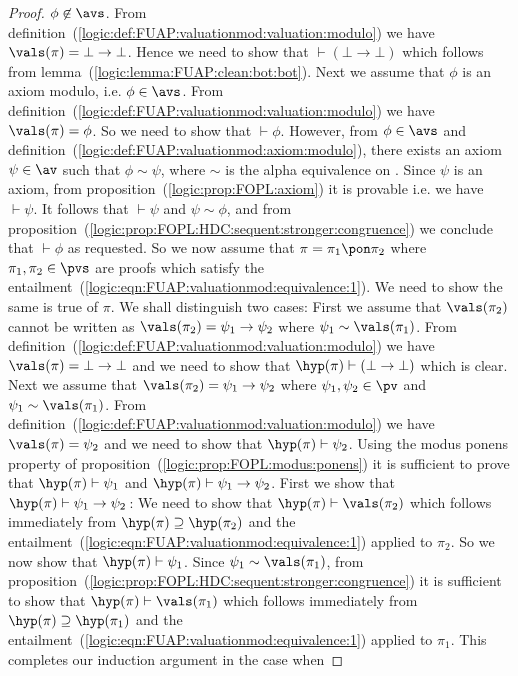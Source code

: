 \begin{proof}
$\phi\not\in\avs$. From
definition~(\ref{logic:def:FUAP:valuationmod:valuation:modulo}) we
have $\vals(\pi)=\bot\to\bot$. Hence we need to show that
$\vdash(\bot\to\bot)$ which follows from
lemma~(\ref{logic:lemma:FUAP:clean:bot:bot}). Next we assume that
$\phi$ is an axiom modulo, i.e. $\phi\in\avs$. From
definition~(\ref{logic:def:FUAP:valuationmod:valuation:modulo}) we
have $\vals(\pi)=\phi$. So we need to show that $\vdash\phi$.
However, from $\phi\in\avs$ and
definition~(\ref{logic:def:FUAP:valuationmod:axiom:modulo}), there
exists an axiom $\psi\in\av$ such that $\phi\sim\psi$, where $\sim$
is the alpha equivalence on \pv. Since $\psi$ is an axiom,
from proposition~(\ref{logic:prop:FOPL:axiom}) it is provable i.e.
we have $\vdash\psi$. It follows that $\vdash\psi$ and
$\psi\sim\phi$, and from
proposition~(\ref{logic:prop:FOPL:HDC:sequent:stronger:congruence})
we conclude that $\vdash\phi$ as requested. So we now assume that
$\pi=\pi_{1}\pon\pi_{2}$ where $\pi_{1},\pi_{2}\in\pvs$ are proofs
which satisfy the
entailment~(\ref{logic:eqn:FUAP:valuationmod:equivalence:1}). We
need to show the same is true of $\pi$. We shall distinguish two
cases: First we assume that $\vals(\pi_{2})$ cannot be written as
$\vals(\pi_{2})=\psi_{1}\to\psi_{2}$ where
$\psi_{1}\sim\vals(\pi_{1})$. From
definition~(\ref{logic:def:FUAP:valuationmod:valuation:modulo}) we
have $\vals(\pi)=\bot\to\bot$ and we need to show that
$\hyp(\pi)\vdash(\bot\to\bot)$ which is clear. Next we assume that
$\vals(\pi_{2})=\psi_{1}\to\psi_{2}$ where $\psi_{1},\psi_{2}\in\pv$
and $\psi_{1}\sim\vals(\pi_{1})$. From
definition~(\ref{logic:def:FUAP:valuationmod:valuation:modulo}) we
have $\vals(\pi)=\psi_{2}$ and we need to show that
$\hyp(\pi)\vdash\psi_{2}$. Using the modus ponens property of
proposition~(\ref{logic:prop:FOPL:modus:ponens}) it is sufficient to
prove that $\hyp(\pi)\vdash\psi_{1}$ and
$\hyp(\pi)\vdash\psi_{1}\to\psi_{2}$. First we show that
$\hyp(\pi)\vdash\psi_{1}\to\psi_{2}$\,: We need to show that
$\hyp(\pi)\vdash\vals(\pi_{2})$ which follows immediately from
$\hyp(\pi)\supseteq\hyp(\pi_{2})$ and the
entailment~(\ref{logic:eqn:FUAP:valuationmod:equivalence:1}) applied
to $\pi_{2}$. So we now show that $\hyp(\pi)\vdash\psi_{1}$. Since
$\psi_{1}\sim\vals(\pi_{1})$, from
proposition~(\ref{logic:prop:FOPL:HDC:sequent:stronger:congruence})
it is sufficient to show that $\hyp(\pi)\vdash\vals(\pi_{1})$ which
follows immediately from $\hyp(\pi)\supseteq\hyp(\pi_{1})$ and the
entailment~(\ref{logic:eqn:FUAP:valuationmod:equivalence:1}) applied
to $\pi_{1}$. This completes our induction argument in the case when

\end{proof}
